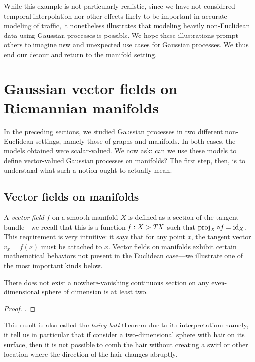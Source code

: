 \documentclass[11pt]{book}
\begin{document}
While this example is not particularly realistic, since we have not considered temporal interpolation nor other effects likely to be important in accurate modeling of traffic, it nonetheless illustrates that modeling heavily non-Euclidean data using Gaussian processes is possible.
We hope these illustrations prompt others to imagine new and unexpected use cases for Gaussian processes.
We thus end our detour and return to the manifold setting.

\section{Gaussian vector fields on Riemannian manifolds}

In the preceding sections, we studied Gaussian processes in two different non-Euclidean settings, namely those of graphs and manifolds.
In both cases, the models obtained were scalar-valued.
We now ask: can we use these models to define vector-valued Gaussian processes on manifolds?
The first step, then, is to understand what such a notion ought to actually mean.

\subsection{Vector fields on manifolds}

A \emph{vector field} $f$ on a smooth manifold $X$ is defined as a section of the tangent bundle---we recall that this is a function $f : X \-> TX$ such that $\operatorname{proj}_X \circ f = \operatorname{id}_X$.
This requirement is very intuitive: it says that for any point $x$, the tangent vector $v_x = f(x)$ must be attached to $x$.
Vector fields on manifolds exhibit certain mathematical behaviors not present in the Euclidean case---we illustrate one of the most important kinds below.

\begin{result}
There does not exist a nowhere-vanishing continuous section on any even-dimensional sphere of dimension is at least two.
\end{result}

\begin{proof}
\textcite[Theorem 13.32]{lee10}.
\end{proof}

This result is also called the \emph{hairy ball} theorem due to its interpretation: namely, it tell us in particular that if consider a two-dimensional sphere with hair on its surface, then it is not possible to comb the hair without creating a swirl or other location where the direction of the hair changes abruptly.
\end{document}
